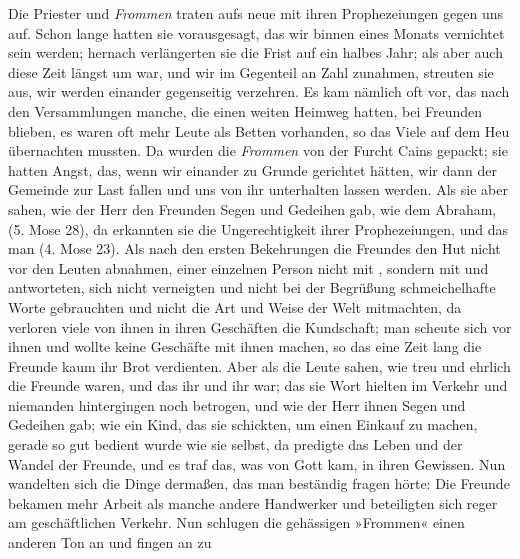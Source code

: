 Die Priester und \textit{Frommen} traten aufs neue mit ihren
Prophezeiungen gegen uns auf. Schon lange hatten sie 
vorausgesagt, das wir binnen eines Monats vernichtet sein werden;
hernach verlängerten sie die Frist auf ein halbes Jahr; als aber
auch diese Zeit längst um war, und wir im Gegenteil an Zahl
zunahmen, streuten sie aus, wir werden einander gegenseitig 
verzehren. Es kam nämlich oft vor, das nach den Versammlungen
manche, die einen weiten Heimweg hatten, bei Freunden blieben,
es waren oft mehr Leute als Betten vorhanden, so das Viele auf
dem Heu übernachten mussten. Da wurden die \textit{Frommen} von
der Furcht Cains gepackt; sie hatten Angst, das, wenn wir 
einander zu Grunde gerichtet hätten, wir dann der Gemeinde zur
Last fallen und uns von ihr unterhalten lassen werden. Als sie
aber sahen, wie der Herr den Freunden Segen und Gedeihen
gab, wie dem Abraham, 
(5. Mose 28), da erkannten sie 
die Ungerechtigkeit ihrer Prophezeiungen, und das man 
(4. Mose 23). Als nach den 
ersten Bekehrungen die Freundes
den Hut nicht vor den Leuten abnahmen, einer einzelnen Person
nicht mit , sondern mit  und 
 antworteten, sich nicht
verneigten und nicht bei der Begrüßung schmeichelhafte Worte
gebrauchten und nicht die Art und Weise der Welt mitmachten, da 
verloren viele von ihnen in ihren Geschäften die Kundschaft; man
scheute sich vor ihnen und wollte keine Geschäfte mit ihnen machen,
so das eine Zeit lang die Freunde kaum ihr Brot verdienten. Aber
als die Leute sahen, wie treu und ehrlich die Freunde waren,
und das ihr  und ihr  war; 
das sie Wort hielten 
im Verkehr und niemanden hintergingen noch betrogen, und wie
der Herr ihnen Segen und Gedeihen gab; wie ein Kind, das sie
schickten, um einen Einkauf zu machen, gerade so gut bedient
wurde wie sie selbst, da predigte das Leben und der Wandel der
Freunde, und es traf das, was von Gott kam, in ihren Gewissen.
Nun wandelten sich die Dinge dermaßen, das man beständig
fragen hörte: 
 Die Freunde
bekamen mehr Arbeit als manche andere Handwerker und 
beteiligten sich reger am geschäftlichen Verkehr. Nun schlugen die
gehässigen »Frommen« einen anderen Ton an und fingen an zu
